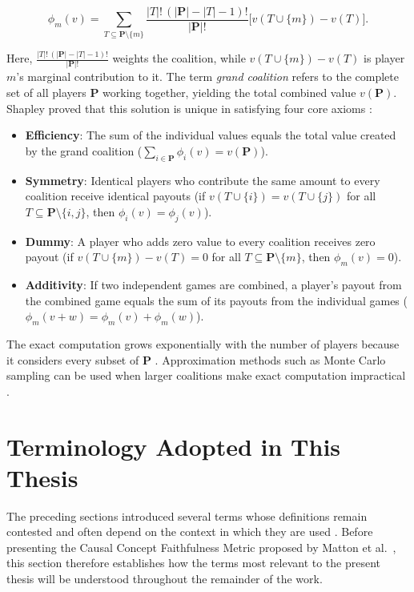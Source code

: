\begin{equation}
	\label{eq:shapley}
	\phi_m(v) = \sum_{T \subseteq \mathbf{P} \setminus \{m\}} \frac{|T|!\, (|\mathbf{P}|-|T|-1)!}{|\mathbf{P}|!} \big[ v(T \cup \{m\}) - v(T) \big].
\end{equation}

Here, $\frac{|T|!\, (|\mathbf{P}|-|T|-1)!}{|\mathbf{P}|!}$ weights the coalition, while $v(T \cup \{m\}) - v(T)$ is player $m$'s marginal contribution to it. The term \emph{grand coalition} refers to the complete set of all players $\mathbf{P}$ working together, yielding the total combined value $v(\mathbf{P})$. Shapley proved that this solution is unique in satisfying four core axioms \cite{shapley17ValueNPerson1953, mitchellSamplingPermutationsShapley2022, parcalabescuMeasuringFaithfulnessSelfconsistency2024}:
\begin{itemize}
	\item \textbf{Efficiency}: The sum of the individual values equals the total value created by the grand coalition ($\sum_{i \in \mathbf{P}} \phi_i(v) = v(\mathbf{P})$).
	\item \textbf{Symmetry}: Identical players who contribute the same amount to every coalition receive identical payouts (if $v(T \cup \{i\}) = v(T \cup \{j\})$ for all $T \subseteq \mathbf{P} \setminus \{i, j\}$, then $\phi_i(v) = \phi_j(v)$).
	\item \textbf{Dummy}: A player who adds zero value to every coalition receives zero payout (if $v(T \cup \{m\}) - v(T) = 0$ for all $T \subseteq \mathbf{P} \setminus \{m\}$, then $\phi_m(v) = 0$).
	\item \textbf{Additivity}: If two independent games are combined, a player's payout from the combined game equals the sum of its payouts from the individual games ($\phi_m(v + w) = \phi_m(v) + \phi_m(w)$).
\end{itemize}

The exact computation grows exponentially with the number of players because it considers every subset of $\mathbf{P}$ \cite{parcalabescuMeasuringFaithfulnessSelfconsistency2024}. Approximation methods such as Monte Carlo sampling can be used when larger coalitions make exact computation impractical \cite{mitchellSamplingPermutationsShapley2022}.

\section{Terminology Adopted in This Thesis}
\label{sec:applying_definitions}
The preceding sections introduced several terms whose definitions remain contested and often depend on the context in which they are used \cite{liptonMythosModelInterpretability2018, roscherExplainableMachineLearning2020}. Before presenting the Causal Concept Faithfulness Metric proposed by Matton et al.~\cite{mattonWalkTalkMeasuring2024}, this section therefore establishes how the terms most relevant to the present thesis will be understood throughout the remainder of the work.

